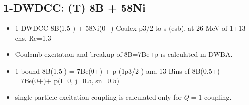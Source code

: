 \documentclass[11pt]{book}
\begin{document}
\subsection{1-DWDCC: (T) 8B + 58Ni} 

\begin{itemize}
\item 1-DWDCC 8B(1.5-) + 58Ni(0+)
 Coulex p3/2 to s (esb), at 26 MeV of 1+13 chs, Rc=1.3
\item Coulomb excitation and breakup of 8B=7Be+p  
     is calculated in DWBA. 
\item 1 bound 8B(1.5-) = 7Be(0+) + p (1p3/2-) 
 and 13 Bins of 8B(0.5+) =7Be(0+)+ p(l=0, j=0.5, sn=0.5)
\item single particle excitation coupling is calculated 
    only for $Q=1$ coupling.  
\end{itemize}
\end{document}
